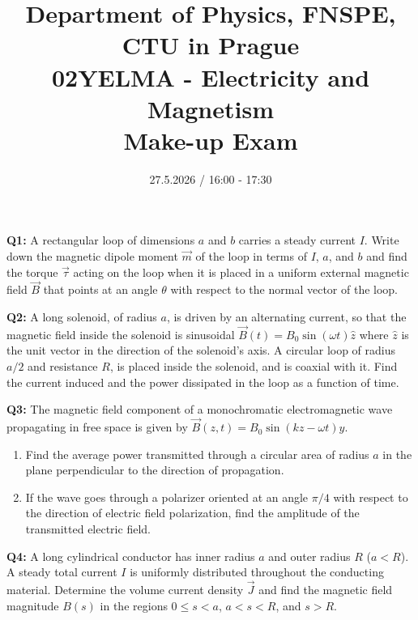 \documentclass[a4paper,12pt]{article}
\title{{\large Department of Physics, FNSPE, CTU in Prague} \\
                  02YELMA - Electricity and Magnetism \\ 
          {\Large \textbf{Make-up Exam}}\vspace{-1cm}}
\date{27.5.2026 / 16:00 - 17:30}
\author{}
\begin{document}
\maketitle

\textbf{Q1:}
A rectangular loop of dimensions $a$ and $b$ carries a steady current $I$. Write down the magnetic dipole moment $\vec{m}$ of the loop in terms of $I$, $a$, and $b$ and find the torque $\vec{\tau}$ acting on the loop when it is placed in a uniform external magnetic field $\vec{B}$ that points at an angle $\theta$ with respect to the normal vector of the loop.

\vspace*{0.3cm}
\textbf{Q2:} A long solenoid, of radius $a$, is driven by an alternating current, so that the magnetic field inside the solenoid is sinusoidal $\vec{B}(t) = B_0 \sin(\omega t) \hat{z}$ where $\hat{z}$ is the unit vector in the direction of the solenoid's axis. A circular loop of radius $a/2$ and resistance $R$, is placed inside the solenoid, and is coaxial with it. Find the current induced and the power dissipated in the loop as a function of time.

\vspace*{0.3cm}
\textbf{Q3:} The magnetic field component of a monochromatic electromagnetic wave propagating in free space is given by $\vec{B}(z,t) = B_0 \sin(kz - \omega t) \hat{y}$.
\begin{enumerate}

    \item[(a)] Find the average power transmitted through a circular area of radius \(a\) in the plane perpendicular to the direction of propagation.
    \item[(b)] If the wave goes through a polarizer oriented at an angle $\pi/4$ with respect to the direction of electric field polarization, find the amplitude of the transmitted electric field.
\end{enumerate}
\noindent

\vspace*{0.3cm}
\textbf{Q4:} A long cylindrical conductor has inner radius $a$ and outer radius $R$ ($a<R$). A steady total current $I$ is uniformly distributed throughout the conducting material. Determine the volume current density $\vec J$ and find the magnetic field magnitude $B(s)$ in the regions $0\le s<a$, $a<s<R$, and $s>R$. 
\end{document}
